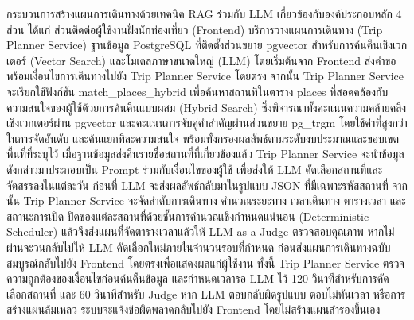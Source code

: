 กระบวนการสร้างแผนการเดินทางด้วยเทคนิค RAG ร่วมกับ LLM เกี่ยวข้องกับองค์ประกอบหลัก 4 ส่วน ได้แก่ ส่วนติดต่อผู้ใช้งานฝั่งนักท่องเที่ยว (Frontend) บริการวางแผนการเดินทาง (Trip Planner Service) ฐานข้อมูล PostgreSQL ที่ติดตั้งส่วนขยาย pgvector สำหรับการค้นคืนเชิงเวกเตอร์ (Vector Search) และโมเดลภาษาขนาดใหญ่ (LLM) โดยเริ่มต้นจาก Frontend ส่งคำขอพร้อมเงื่อนไขการเดินทางไปยัง Trip Planner Service โดยตรง จากนั้น Trip Planner Service จะเรียกใช้ฟังก์ชัน match\_places\_hybrid เพื่อค้นหาสถานที่ในตาราง places ที่สอดคล้องกับความสนใจของผู้ใช้ด้วยการค้นคืนแบบผสม (Hybrid Search) ซึ่งพิจารณาทั้งคะแนนความคล้ายคลึงเชิงเวกเตอร์ผ่าน pgvector และคะแนนการจับคู่คำสำคัญผ่านส่วนขยาย pg\_trgm โดยใช้ค่าที่สูงกว่าในการจัดอันดับ และค้นแยกทีละความสนใจ พร้อมทั้งกรองผลลัพธ์ตามระดับงบประมาณและขอบเขตพื้นที่ที่ระบุไว้ เมื่อฐานข้อมูลส่งคืนรายชื่อสถานที่ที่เกี่ยวข้องแล้ว Trip Planner Service จะนำข้อมูลดังกล่าวมาประกอบเป็น Prompt ร่วมกับเงื่อนไขของผู้ใช้ เพื่อส่งให้ LLM คัดเลือกสถานที่และจัดสรรลงในแต่ละวัน ก่อนที่ LLM จะส่งผลลัพธ์กลับมาในรูปแบบ JSON ที่มีเฉพาะรหัสสถานที่ จากนั้น Trip Planner Service จะจัดลำดับการเดินทาง คำนวณระยะทาง เวลาเดินทาง ตารางเวลา และสถานะการเปิด-ปิดของแต่ละสถานที่ด้วยชั้นการคำนวณเชิงกำหนดแน่นอน (Deterministic Scheduler) แล้วจึงส่งแผนที่จัดตารางเวลาแล้วให้ LLM-as-a-Judge ตรวจสอบคุณภาพ หากไม่ผ่านจะวนกลับไปให้ LLM คัดเลือกใหม่ภายในจำนวนรอบที่กำหนด ก่อนส่งแผนการเดินทางฉบับสมบูรณ์กลับไปยัง Frontend โดยตรงเพื่อแสดงผลแก่ผู้ใช้งาน ทั้งนี้ Trip Planner Service ตรวจความถูกต้องของเงื่อนไขก่อนค้นคืนข้อมูล และกำหนดเวลารอ LLM ไว้ 120 วินาทีสำหรับการคัดเลือกสถานที่ และ 60 วินาทีสำหรับ Judge หาก LLM ตอบกลับผิดรูปแบบ ตอบไม่ทันเวลา หรือการสร้างแผนล้มเหลว ระบบจะแจ้งข้อผิดพลาดกลับไปยัง Frontend โดยไม่สร้างแผนสำรองขึ้นเอง

